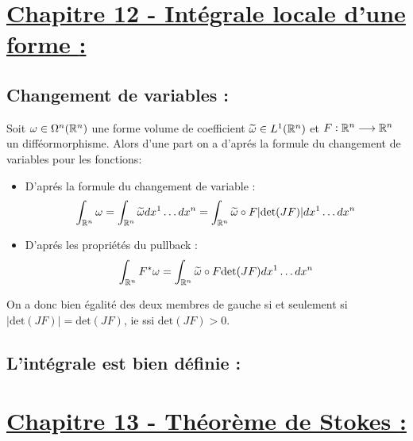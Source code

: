 \section*{\uline{Chapitre 12 - Intégrale locale d'une forme {:}}}
   \subsection*{Changement de variables {:}}
   Soit \( \omega \in \Omega^n( \mathbb{R}^n) \) une forme volume de coefficient \( \widetilde{\omega} \in L^1(\mathbb{R}^n) \) et \( F : \mathbb{R}^n \longrightarrow \mathbb{R}^n \) un difféormorphisme. Alors d'une part on a d'aprés la formule du changement de variables pour les fonctions:
   \begin{itemize}
      \item D'aprés la formule du changement de variable :
      \[ 
         \int_{\mathbb{R}^n} \omega =  \int_{\mathbb{R}^n} \widetilde{\omega}dx^1 \ldots dx^n = \int_{\mathbb{R}^n} \widetilde{\omega} \circ F |\text{det}(JF)| dx^1 \ldots dx^n
      \]
      \item D'aprés les propriétés du pullback :
      \[ 
         \int_{\mathbb{R}^n} F^*\omega = \int_{\mathbb{R}^n} \widetilde{\omega} \circ F \text{det}(JF) dx^1 \ldots dx^n
      \]
   \end{itemize}
   On a donc bien égalité des deux membres de gauche si et seulement si \( |\text{det}(JF)| = \text{det}(JF) \), ie ssi \( \text{det}(JF) > 0 \).
   \subsection*{L'intégrale est bien définie {:}}
   
\pagebreak

\section*{\uline{Chapitre 13 - Théorème de Stokes {:}}}
